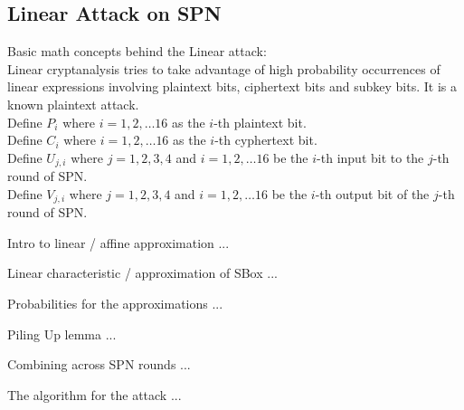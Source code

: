 \documentclass[9pt]{beamer}
\begin{document}
\subsection{Linear Attack on SPN}
\begin{frame}
\large{Basic math concepts behind the Linear attack:}\\
\vspace{5 mm}
Linear cryptanalysis tries to take advantage of high probability occurrences of  linear expressions involving plaintext bits, ciphertext bits and subkey bits.  It is a known plaintext attack.\\
\vspace{5 mm}
Define $P_i$ where $i = 1, 2, \dots 16$ as the $i$-th plaintext bit.\\
Define $C_i$ where $i = 1, 2, \dots 16$ as the $i$-th cyphertext bit.\\
Define $U_{j,i}$ where $j = 1, 2, 3, 4$ and $i = 1, 2, \dots 16$ be the $i$-th input bit to the $j$-th round of SPN.\\
Define $V_{j,i}$ where $j = 1, 2, 3, 4$ and $i = 1, 2, \dots 16$ be the $i$-th output bit of the $j$-th round of SPN.\\
\end{frame}

\begin{frame}
Intro to linear / affine approximation ... 

\end{frame}

\begin{frame}
Linear characteristic / approximation of SBox ...

\end{frame}

\begin{frame}
Probabilities for the approximations ...

\end{frame}

\begin{frame}
Piling Up lemma ...

\end{frame}

\begin{frame}
Combining across SPN rounds ... 

\end{frame}

\begin{frame}
The algorithm for the attack ... 

\end{frame}
\end{document}
